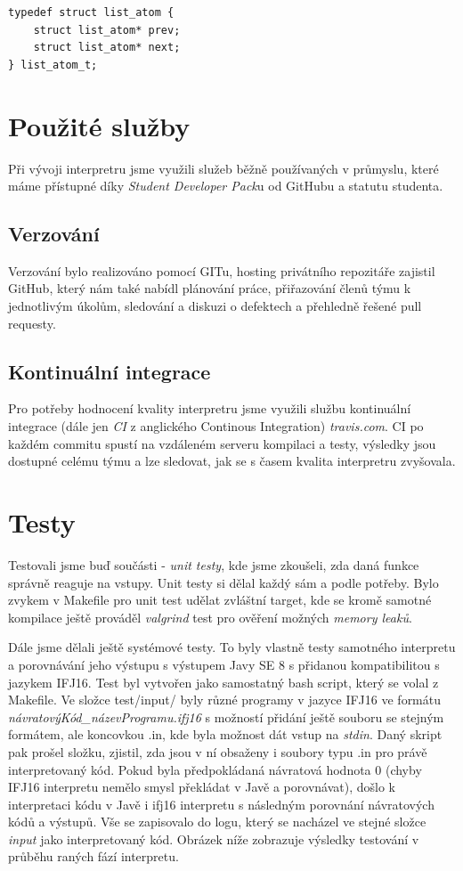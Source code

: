 \documentclass[a4paper,11pt]{article}
\begin{document}
\begin{lstlisting}[caption={Uzel seznamu alokací}, label={lst:gcAllocAtom}]
typedef struct list_atom {
    struct list_atom* prev;
    struct list_atom* next;
} list_atom_t;
\end{lstlisting}


\section{Použité služby}
Při vývoji interpretru jsme využili služeb běžně používaných v průmyslu, které máme přístupné díky \emph{Student Developer Pack}u od GitHubu a statutu studenta.

\subsection{Verzování}
Verzování bylo realizováno pomocí GITu, hosting privátního repozitáře zajistil GitHub, který nám také nabídl plánování práce, přiřazování členů týmu k jednotlivým úkolům, sledování a diskuzi o defektech a přehledně řešené pull requesty.

\subsection{Kontinuální integrace}
Pro potřeby hodnocení kvality interpretru jsme využili službu kontinuální integrace (dále jen \emph{CI} z anglického Continous Integration) \emph{travis.com}. CI po každém commitu spustí na vzdáleném serveru kompilaci a testy, výsledky jsou dostupné celému týmu a lze sledovat, jak se s časem kvalita interpretru zvyšovala.

\section{Testy}
Testovali jsme buď součásti - \textit{unit testy}, kde jsme zkoušeli, zda daná funkce správně reaguje na vstupy. Unit testy si dělal každý sám a podle potřeby. Bylo zvykem v Makefile pro unit test udělat zvláštní target, kde se kromě samotné kompilace ještě prováděl \textit{valgrind} test pro ověření možných \textit{memory leaků}. 

Dále jsme dělali ještě systémové testy. To byly vlastně testy samotného interpretu a porovnávání jeho výstupu s výstupem Javy SE 8 s přidanou kompatibilitou s jazykem IFJ16. Test byl vytvořen jako samostatný bash script, který se volal z Makefile. Ve složce test/input/ byly různé programy v jazyce IFJ16 ve formátu \textit{návratovýKód\_názevProgramu.ifj16} s možností přidání ještě souboru se stejným formátem, ale koncovkou .in, kde byla možnost dát vstup na \textit{stdin}. Daný skript pak prošel složku, zjistil, zda jsou v ní obsaženy i soubory typu .in pro právě interpretovaný kód. Pokud byla předpokládaná návratová hodnota 0 (chyby IFJ16 interpretu nemělo smysl překládat v Javě a porovnávat), došlo k interpretaci kódu v Javě i ifj16 interpretu s následným porovnání návratových kódů a výstupů. Vše se zapisovalo do logu, který se nacházel ve stejné složce \textit{input} jako interpretovaný kód. Obrázek níže zobrazuje výsledky testování v průběhu raných fází interpretu.\\
\end{document}
